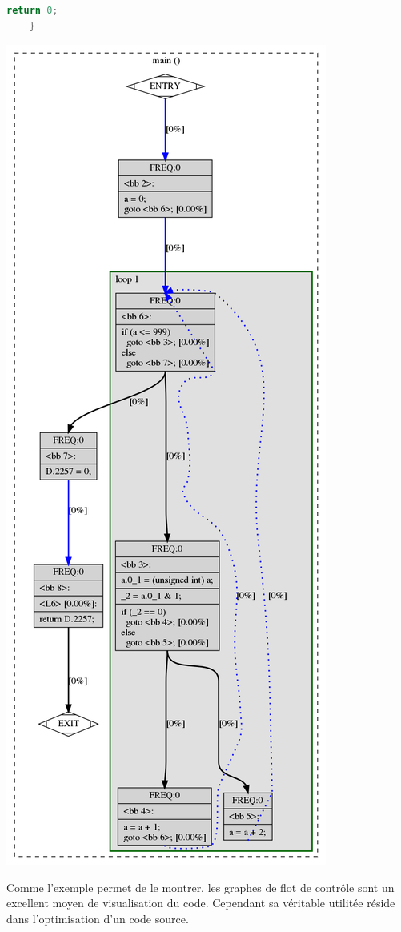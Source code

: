 \begin{multicols}{2}
\begin{lstlisting}[language=c, caption={Exemple de programme pour construire un CFG}, captionpos=b]
        return 0;
    }
\end{lstlisting}
\begin{center}
    \includegraphics[scale=0.22]{images/graph.png}
\end{center}
\end{multicols}
Comme l'exemple permet de le montrer, les graphes de flot de contrôle sont un excellent moyen de visualisation du code. Cependant sa véritable utilitée réside dans l'optimisation d'un code source.
